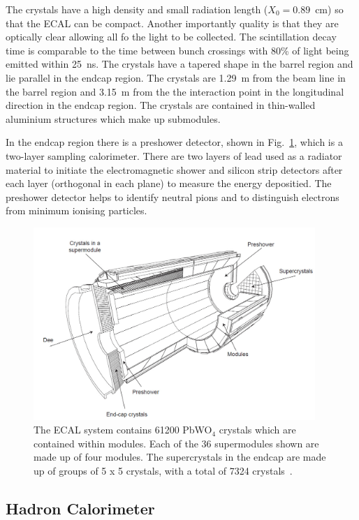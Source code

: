The crystals have a high density and small radiation length ($X_{0}=0.89$~cm) so that the ECAL can be compact. Another importantly quality is that they are optically clear allowing all fo the light to be collected. The scintillation decay time is comparable to the time between bunch crossings with 80\% of light being emitted within 25~ns. The crystals have a tapered shape in the barrel region and lie parallel in the endcap region. The crystals are 1.29~m from the beam line in the barrel region and 3.15~m from the the interaction point in the longitudinal direction in the endcap region. The crystals are contained in thin-walled aluminium structures which make up submodules.

In the endcap region there is a preshower detector, shown in Fig.~\ref{fig:ecal}, which is a two-layer sampling calorimeter. There are two layers of lead used as a radiator material to initiate the electromagnetic shower and silicon strip detectors after each layer (orthogonal in each plane) to measure the energy depositied. The preshower detector helps to identify neutral pions and to distinguish electrons from minimum ionising particles.

\begin{figure}[ht!]
\centering
    \includegraphics[width=0.95\textwidth]{images/ecal.png}
    \caption{The ECAL system contains 61200 PbWO$_{4}$ crystals which are contained within modules. Each of the 36 supermodules shown are made up of four modules. The supercrystals in the endcap are made up of groups of 5 x 5 crystals, with a total of 7324 crystals~\cite{Isildak:2013kfa}.}
    \label{fig:ecal}
\end{figure}

\subsection{Hadron Calorimeter}

